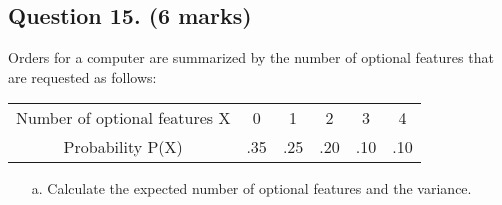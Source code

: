 	\subsection*{Question 15. (6 marks) }
	Orders for a computer are summarized by the number of optional
	features that are requested as follows:
	\begin{center}
		\begin{tabular}{|c||c|c|c|c|c|}
			\hline
			
			Number of optional features X & 0 & 1 & 2& 3 & 4 \\
			Probability P(X)& .35 & .25 & .20& .10 & .10 \\
			\hline
		\end{tabular}
	\end{center}
	
	\begin{itemize}
		\item[a.] Calculate the expected number of optional features and the variance.
	\end{itemize}

	
	
